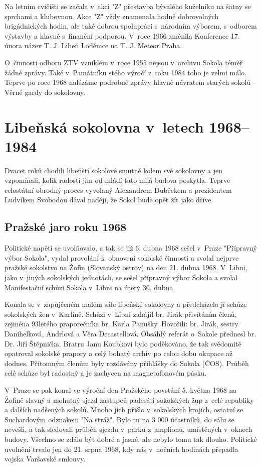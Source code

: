 \documentclass[a5paper, 12pt, twoside]{article}
\begin{document}
Na letním cvičišti se začala v~akci "Z" přestavba bývalého kuželníku na
šatny se sprchami a klubovnou. Akce "Z" vždy znamenala hodně
dobrovolných brigádnických hodin, ale také dobrou spolupráci s~národním
výborem, s~odborem výstavby a hlavně s~finanční podporou. V~roce 1966
změnila Konference 17. února název T. J. Libeň Loděnice na T. J. Meteor
Praha.

O~činnosti odboru ZTV vzniklém v~roce 1955 nejsou v~archivu Sokola téměř
žádné zprávy. Také v~Památníku stého výročí z~roku 1984 toho je velmi
málo. Teprve po roce 1968 nalézáme podrobné zprávy hlavně návratem
starých sokolů -- Věrné gardy do sokolovny.

\section{Libeňská sokolovna v~letech
1968--1984}

Dvacet roků chodili libeňští sokolové smutně kolem své sokolovny a jen
vzpomínali, kolik radostí jim od mládí tato milá budova poskytla. Teprve
celostátní obrodný proces vyvolaný Alexandrem Dubčekem a prezidentem
Ludvíkem Svobodou dával naději, že Sokol bude opět žít jako dříve.

\subsection{Pražské jaro roku 1968}

Politické napětí se uvolňovalo, a tak se již 6. dubna 1968 sešel v~Praze
"Přípravný výbor Sokola", vydal provolání k~obnovení sokolské činnosti
a svolal nejprve pražské sokolstvo na Žofín (Slovanský ostrov) na den
21. dubna 1968. V~Libni, jako v~jiných sokolských jednotách, se sešel
přípravný výbor Sokola a svolal Manifestační schůzi Sokola v~Libni na
úterý 30. dubna.

Konala se v~zapůjčeném malém sále libeňské sokolovny a předcházela jí
schůze sokolských žen v~Karlíně. Schůzi v~Libni zahájil br. Jirák
přivítáním členů, zejména 93letého praporečníka br. Karla Panušky.
Hovořili: br. Jirák, sestry Danihelková, Andrlová a Věra Decastellová.
Obsáhlý referát o~Sokole přednesl br. Dr. Jiří Štěpnička. Bratru Janu
Koubkovi bylo poděkováno, že tak svědomitě opatroval sokolské prapory a
celý bohatý archiv po celou dobu okupace až dodnes. Přítomným členům
byly rozdávány přihlášky do Sokola (ČOS). Průběh celé schůze byl
radostný a je zachycen na magnetofonovém pásku.

V~Praze se pak konal ve výroční den Pražského povstání 5. května 1968 na
Žofíně slavný a mohutný sjezd zástupců padesáti sokolských žup z~celé
republiky a dalších nadšených sokolů. Mnoho jich přišlo v~sokolských
krojích, ostatní se Suchardovým odznakem "Na stráž". Bylo tu na 3 000
účastníků, do sálu se nevešli, a tak sledovali průběh sjezdu v~parku
z~amplionů, umístěných v~oknech budovy. Všechno se zdálo být dobré a
jasné, ale nebylo tomu tak dlouho. Politické uvolnění trvalo jen do 21.
srpna 1968, kdy nás v~nočních hodinách přepadla vojska Varšavské
smlouvy.
\end{document}
